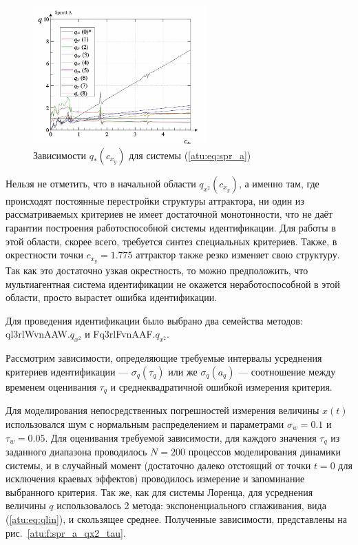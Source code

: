 \begin{figure}[htb!]
\centerline{
  \includegraphics[width=0.60\textwidth]{p/cha/spr_a/sprott_a_q-p_c_x_y.png}
}
\caption{Зависимости $q_{*}(c_{x_y})$ для системы (\ref{atu:eq:spr_a}) }
\label{atu:f:spr_a_q}
\end{figure}

Нельзя не отметить, что в начальной области
$q_{x^2}(c_{x_y}) $, а именно там, где происходят постоянные
перестройки структуры аттрактора, ни один из рассматриваемых критериев
не имеет достаточной монотонности, что не даёт гарантии
построения работоспособной системы идентификации.
Для работы в этой области, скорее всего, требуется синтез специальных критериев.
Также, в окрестности точки $c_{x_y}=1.775$ аттрактор также резко изменяет свою структуру.
Так как это достаточно узкая окрестность,
то можно предположить, что мультиагентная система идентификации
не окажется неработоспособной в этой области, просто вырастет
ошибка идентификации.

Для проведения идентификации было выбрано два семейства методов:
ql3rlWvnAAW.$q_{x^2}$ и
Fq3rlFvnAAF.$q_{x^2}$.

Рассмотрим зависимости, определяющие
требуемые интервалы усреднения критериев идентификации
--- $ \sigma_q(\tau_q) $
или же  $ \sigma_q(a_q) $ --- соотношение между
временем оценивания $\tau_q$ и среднеквадратичной
ошибкой измерения критерия.

Для моделирования непосредственных погрешностей измерения величины
$x(t)$ использовался шум с нормальным распределением
и параметрами $\sigma_w=0.1$ и $\tau_w=0.05$.
Для оценивания требуемой зависимости, для каждого
значения $\tau_q$ из заданного диапазона
проводилось $N=200$ процессов моделирования динамики системы,
и в случайный момент (достаточно далеко отстоящий от точки $t=0$ для исключения краевых эффектов)
проводилось измерение и запоминание выбранного критерия.
Так же, как для системы Лоренца,
для усреднения величины $q$ использовалось 2 метода:
экспоненциального сглаживания, вида (\ref{atu:eq:qlin}), и скользящее среднее.
Полученные зависимости,  представлены на
рис.~\ref{atu:f:spr_a_qx2_tau}.


